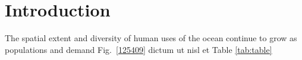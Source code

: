 \section{Introduction}
\label{introduction}

The spatial extent and diversity of human uses of the ocean continue to grow as populations and demand  Fig.~\ref{125409} dictum ut nisl et Table \ref{tab:table}
